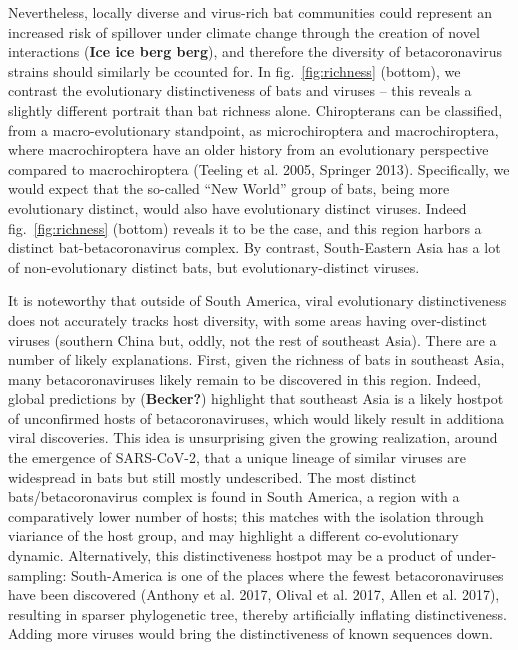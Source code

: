 \documentclass[11pt]{article}
\begin{document}
Nevertheless, locally diverse and virus-rich bat communities could
represent an increased risk of spillover under climate change through
the creation of novel interactions (\textbf{Ice ice berg berg}), and
therefore the diversity of betacoronavirus strains should similarly be
ccounted for. In fig.~\ref{fig:richness} (bottom), we contrast the
evolutionary distinctiveness of bats and viruses -- this reveals a
slightly different portrait than bat richness alone. Chiropterans can be
classified, from a macro-evolutionary standpoint, as microchiroptera and
macrochiroptera, where macrochiroptera have an older history from an
evolutionary perspective compared to macrochiroptera (Teeling et al.
2005, Springer 2013). Specifically, we would expect that the so-called
``New World'' group of bats, being more evolutionary distinct, would
also have evolutionary distinct viruses. Indeed fig.~\ref{fig:richness}
(bottom) reveals it to be the case, and this region harbors a distinct
bat-betacoronavirus complex. By contrast, South-Eastern Asia has a lot
of non-evolutionary distinct bats, but evolutionary-distinct viruses.

It is noteworthy that outside of South America, viral evolutionary
distinctiveness does not accurately tracks host diversity, with some
areas having over-distinct viruses (southern China but, oddly, not the
rest of southeast Asia). There are a number of likely explanations.
First, given the richness of bats in southeast Asia, many
betacoronaviruses likely remain to be discovered in this region. Indeed,
global predictions by (\textbf{Becker?}) highlight that southeast Asia
is a likely hostpot of unconfirmed hosts of betacoronaviruses, which
would likely result in additiona viral discoveries. This idea is
unsurprising given the growing realization, around the emergence of
SARS-CoV-2, that a unique lineage of similar viruses are widespread in
bats but still mostly undescribed. The most distinct
bats/betacoronavirus complex is found in South America, a region with a
comparatively lower number of hosts; this matches with the isolation
through viariance of the host group, and may highlight a different
co-evolutionary dynamic. Alternatively, this distinctiveness hostpot may
be a product of under-sampling: South-America is one of the places where
the fewest betacoronaviruses have been discovered (Anthony et al. 2017,
Olival et al. 2017, Allen et al. 2017), resulting in sparser
phylogenetic tree, thereby artificially inflating distinctiveness.
Adding more viruses would bring the distinctiveness of known sequences
down.
\end{document}
